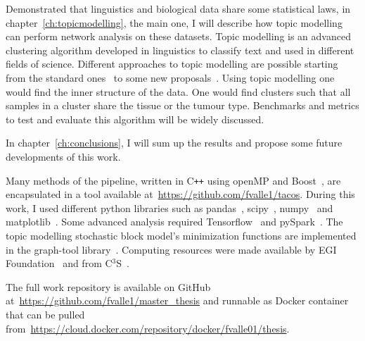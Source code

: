 Demonstrated that linguistics and biological data share some statistical laws, in chapter~\ref{ch:topicmodelling}, the main one, I will describe how topic modelling can perform network analysis on these datasets. Topic modelling is an advanced clustering algorithm developed in linguistics to classify text and used in different fields of science. Different approaches to topic modelling are possible starting from the standard ones~\cite{Zhou2016} to some new proposals~\cite{Lancichinetti2015,Martini2017,gerlach2018network}. Using topic modelling one would find the inner structure of the data. One would find clusters such that all samples in a cluster share the tissue or the tumour type. Benchmarks and metrics to test and evaluate this algorithm will be widely discussed.

In chapter~\ref{ch:conclusions}, I will sum up the results and propose some future developments of this work.

Many methods of the pipeline, written in C\texttt{++} using openMP and Boost~\cite{siek2002boost}, are encapsulated in a tool available at~\url{https://github.com/fvalle1/tacos}. During this work, I used different python libraries such as pandas~\cite{mckinney2010data}, scipy~\cite{jones2014scipy}, numpy~\cite{oliphant2006guide} and matplotlib~\cite{hunter2007matplotlib}. Some advanced analysis required Tensorflow~\cite{tensorflow2015-whitepaper} and pySpark~\cite{Zaharia:2016:ASU:3013530.2934664}. The topic modelling stochastic block model's minimization functions are implemented in the graph-tool library~\cite{peixoto_graph-tool_2014}. Computing resources were made available by EGI Foundation~\cite{fernandez2015egi} and from C$^{\text{3}}$S~\cite{occamchep}.

The full work repository is available on GitHub\textsuperscript{\tiny\textcopyright} at~\url{https://github.com/fvalle1/master_thesis} and runnable as Docker\textsuperscript{\tiny\textcopyright} container that can be pulled from~\url{https://cloud.docker.com/repository/docker/fvalle01/thesis}. 